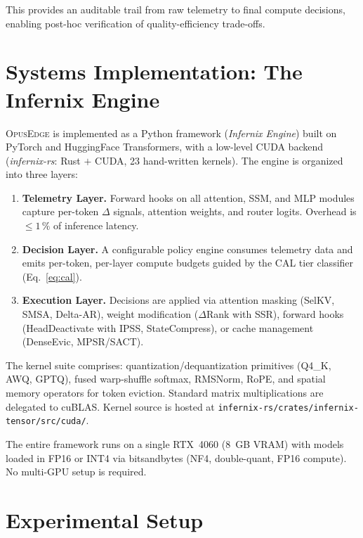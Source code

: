 \documentclass[11pt]{article}
\newcommand{\dsig}{\Delta}
\newcommand{\opusedge}{\textsc{OpusEdge}}
\begin{document}
\noindent This provides an auditable trail from raw telemetry to final
compute decisions, enabling post-hoc verification of quality-efficiency
trade-offs.

\section{Systems Implementation: The Infernix Engine}
\opusedge{} is implemented as a Python framework (\emph{Infernix Engine})
built on PyTorch and HuggingFace Transformers, with a low-level CUDA backend
(\emph{infernix-rs}: Rust $+$ CUDA, 23 hand-written kernels). The engine is
organized into three layers:

\begin{enumerate}[leftmargin=1.4em,itemsep=2pt,topsep=2pt]
  \item \textbf{Telemetry Layer.} Forward hooks on all attention, SSM, and
    MLP modules capture per-token $\dsig$ signals, attention weights, and
    router logits. Overhead is $\le 1\,\%$ of inference latency.
  \item \textbf{Decision Layer.} A configurable policy engine consumes
    telemetry data and emits per-token, per-layer compute budgets guided by
    the CAL tier classifier (Eq.~\ref{eq:cal}).
  \item \textbf{Execution Layer.} Decisions are applied via attention
    masking (SelKV, SMSA, Delta-AR), weight modification ($\dsig$Rank with
    SSR), forward hooks (HeadDeactivate with IPSS, StateCompress), or cache
    management (DenseEvic, MPSR/SACT).
\end{enumerate}

The kernel suite comprises: quantization/dequantization primitives (Q4\_K,
AWQ, GPTQ), fused warp-shuffle softmax, RMSNorm, RoPE, and spatial memory
operators for token eviction. Standard matrix multiplications are delegated
to cuBLAS. Kernel source is hosted at
\texttt{infernix-rs/crates/infernix-tensor/src/cuda/}.

The entire framework runs on a single RTX~4060 (8~GB VRAM) with models
loaded in FP16 or INT4 via bitsandbytes (NF4, double-quant, FP16 compute).
No multi-GPU setup is required.

\section{Experimental Setup}
\end{document}
